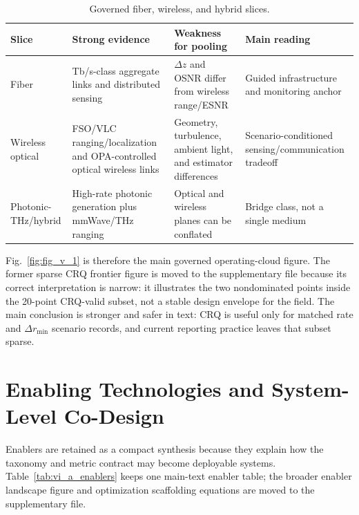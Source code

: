 \documentclass[letterpaper,journal]{IEEEtran}
\begin{document}
\begin{table}[!t]
    \caption{Governed fiber, wireless, and hybrid slices.}
    \label{tab:comparative_slices}
    \centering
    \scriptsize
    \setlength{\tabcolsep}{2.8pt}
    \renewcommand{\arraystretch}{1.08}
    \begin{tabularx}{\textwidth}{@{}p{1.7cm}p{2.0cm}p{2.1cm}X@{}}
        \toprule
        Slice & Strong evidence & Weakness for pooling & Main reading \\
        \midrule
        Fiber & Tb/s-class aggregate links and distributed sensing \cite{O_ISAC_046} & $\Delta z$ and OSNR differ from wireless range/ESNR & Guided infrastructure and monitoring anchor \\
        Wireless optical & FSO/VLC ranging/localization and OPA-controlled optical wireless links \cite{O_ISAC_023,O_ISAC_061} & Geometry, turbulence, ambient light, and estimator differences & Scenario-conditioned sensing/communication tradeoff \\
        Photonic-THz/hybrid & High-rate photonic generation plus mmWave/THz ranging \cite{O_ISAC_029,O_ISAC_105} & Optical and wireless planes can be conflated & Bridge class, not a single medium \\
        \bottomrule
    \end{tabularx}
\end{table}

Fig.~\ref{fig:fig_v_1} is therefore the main governed operating-cloud figure. The former sparse CRQ frontier figure is moved to the supplementary file because its correct interpretation is narrow: it illustrates the two nondominated points inside the 20-point CRQ-valid subset, not a stable design envelope for the field. The main conclusion is stronger and safer in text: CRQ is useful only for matched rate and $\Delta r_{\min}$ scenario records, and current reporting practice leaves that subset sparse.

\section{Enabling Technologies and System-Level Co-Design}
\label{sec:enablers}

Enablers are retained as a compact synthesis because they explain how the taxonomy and metric contract may become deployable systems. Table~\ref{tab:vi_a_enablers} keeps one main-text enabler table; the broader enabler landscape figure and optimization scaffolding equations are moved to the supplementary file.
\end{document}
